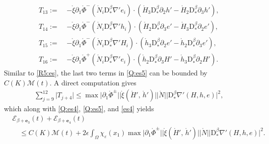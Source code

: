 \documentclass[twoside,11pt]{article}
\numberwithin{equation}{section}
\def\p{\partial}
\begin{document}
\begin{align}
	\nonumber 	T_{13}:=\; &-{\mathring{\xi} }\p_1\mathring{\Phi}^- \left(\mathring{N}_i  \mathrm{D}_*^{\beta}\nabla' e_i\right)\cdot
	\left({ \mathring{H}_3}  \mathrm{D}_*^{\beta}\p_2  h'
	-{ \mathring{H}_2}  \mathrm{D}_*^{\beta}\p_3  h' \right),
	\\[1mm]
	\nonumber 	T_{14}:=\; &-{\mathring{\xi} } \p_1\mathring{\Phi}^- \left(\mathring{N}_i  \mathrm{D}_*^{\beta}\nabla' h_i\right)\cdot
	\left(
	{ \mathring{H}_2}  \mathrm{D}_*^{\beta}\p_3  e'
	-{ \mathring{H}_3}  \mathrm{D}_*^{\beta}\p_2 e' \right),
	\\[1mm]
	\nonumber 	T_{15}:=\; &-{\mathring{\xi} } \p_1\mathring{\Phi}^- \left(\mathring{N}_i  \mathrm{D}_*^{\beta}\nabla' H_i\right)\cdot
	\left({ \mathring{h}_3}  \mathrm{D}_*^{\beta}\p_2   e'
	-{ \mathring{h}_2}  \mathrm{D}_*^{\beta}\p_3   e'  \right),
	\\[1mm]
	\nonumber 	T_{16}:=\; &-{\mathring{\xi} } \p_1\mathring{\Phi}^+\left(\mathring{N}_i \mathrm{D}_*^{\beta}\nabla' e_i\right)\cdot
	\left(
	{ \mathring{h}_2}  \mathrm{D}_*^{\beta}\p_3    H'
	-{ \mathring{h}_3}  \mathrm{D}_*^{\beta}\p_2    H'
	\right).
\end{align}
Similar to \eqref{R5:es},
the last two terms in \eqref{Q:es5} can be bounded by $C(K)\mathcal{M}(t)$.
A direct computation gives
\begin{align}
	\sum_{j=9}^{12}\big|T_{j+4}\big|\leq
	 \max\big|\p_1\mathring{\Phi}^{\pm}\big|\big|{\mathring{\xi} (  \mathring{H}' ,\,  \mathring{h}')}\big|\big|\mathring{N} \big|\big| \mathrm{D}_*^{\beta}\nabla' (H, h, e)\big|^2
	 ,
	\nonumber
\end{align}
which along with \eqref{Q:es4}, \eqref{Q:es5}, and \eqref{es4} yields
\begin{align}
&	\mathcal{E}_{\beta+\mathbf{e}_3}(t)+
\mathcal{E}_{\beta+\mathbf{e}_4}(t)\nonumber \\[1mm]
&\quad	\leq
	C(K)\mathcal{M}(t) +
2\epsilon   \int_{\Omega} \chi_{\varepsilon}(x_1)
	 \max\big|\p_1\mathring{\Phi}^{\pm}\big|\big|{\mathring{\xi} (  \mathring{H}' ,\,  \mathring{h}')}\big|\big|\mathring{N} \big|\big| \mathrm{D}_*^{\beta}\nabla' (H, h, e)\big|^2
	.
	\label{es4b}
\end{align}
\end{document}
